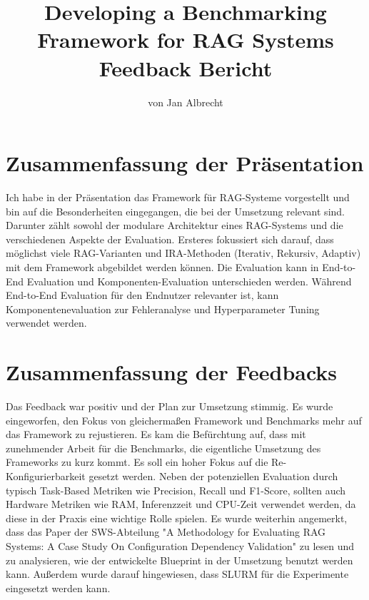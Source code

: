 \documentclass[letterpaper, 10 pt, conference]{ieeeconf}
\title{\LARGE \bf
Developing a Benchmarking Framework for RAG Systems \newline Feedback Bericht
}
\author{von Jan Albrecht}
\begin{document}
\maketitle
\thispagestyle{plain}
\pagestyle{plain}

\section{Zusammenfassung der Präsentation}
Ich habe in der Präsentation das Framework für RAG-Systeme vorgestellt und bin auf die Besonderheiten eingegangen, die bei der Umsetzung relevant sind.
Darunter zählt sowohl der modulare Architektur eines RAG-Systems und die verschiedenen Aspekte der Evaluation. 
Ersteres fokussiert sich darauf, dass möglichst viele RAG-Varianten und IRA-Methoden (Iterativ, Rekursiv, Adaptiv) mit dem Framework abgebildet werden können.
Die Evaluation kann in End-to-End Evaluation und Komponenten-Evaluation unterschieden werden. 
Während End-to-End Evaluation für den Endnutzer relevanter ist, kann Komponentenevaluation zur Fehleranalyse und Hyperparameter Tuning verwendet werden.\\


\section{Zusammenfassung der Feedbacks}
Das Feedback war positiv und der Plan zur Umsetzung stimmig. 
Es wurde eingeworfen, den Fokus von gleichermaßen Framework und Benchmarks mehr auf das Framework zu rejustieren.
Es kam die Befürchtung auf, dass mit zunehmender Arbeit für die Benchmarks, die eigentliche Umsetzung des Frameworks zu kurz kommt. Es soll ein hoher Fokus auf die Re-Konfigurierbarkeit gesetzt werden.
Neben der potenziellen Evaluation durch typisch Task-Based Metriken wie Precision, Recall und F1-Score, sollten auch Hardware Metriken wie RAM, Inferenzzeit und CPU-Zeit verwendet werden, da diese in der Praxis eine wichtige Rolle spielen.
Es wurde weiterhin angemerkt, dass das Paper der SWS-Abteilung "A Methodology for Evaluating RAG Systems: A Case Study On Configuration Dependency Validation" zu lesen und zu analysieren, wie der entwickelte Blueprint in der Umsetzung benutzt werden kann.
Außerdem wurde darauf hingewiesen, dass SLURM für die Experimente eingesetzt werden kann.\\
\end{document}
